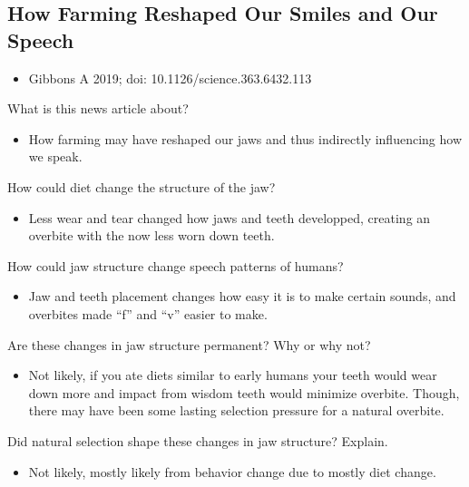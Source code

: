 \documentclass[12pt,a4paper]{article}
\begin{document}
\subsection{How Farming Reshaped Our Smiles and Our Speech}
\begin{itemize}
    \item Gibbons A 2019; doi: 10.1126/science.363.6432.113
\end{itemize}
\begin{enumerate}
    {\color{darklc}\item What is this news article about?}
        \begin{itemize}
            \item How farming may have reshaped our jaws and thus indirectly influencing how we speak.
        \end{itemize}
    {\color{darklc}\item How could diet change the structure of the jaw?}
        \begin{itemize}
            \item Less wear and tear changed how jaws and teeth developped, creating an overbite with the now less worn down teeth.
        \end{itemize}
    {\color{darklc}\item How could jaw structure change speech patterns of humans?}
        \begin{itemize}
            \item Jaw and teeth placement changes how easy it is to make certain sounds, and overbites made ``f'' and ``v'' easier to make.
        \end{itemize}
    {\color{darklc}\item Are these changes in jaw structure permanent? Why or why not?}
        \begin{itemize}
            \item Not likely, if you ate diets similar to early humans your teeth would wear down more and impact from wisdom teeth would minimize overbite. Though, there may have been some lasting selection pressure for a natural overbite.
        \end{itemize}
    {\color{darklc}\item Did natural selection shape these changes in jaw structure? Explain.}
        \begin{itemize}
            \item Not likely, mostly likely from behavior change due to mostly diet change.
        \end{itemize}

\end{enumerate}
\end{document}
